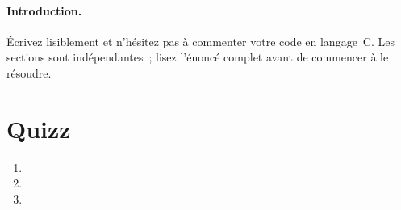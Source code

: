\documentclass[ds]{sujet}
\begin{document}
\formation{} 
\matiere{}  
\auteur{} 
\def\SujetClsNumero{}
\paragraph{Introduction.}
\'Ecrivez lisiblement et n'h\'esitez pas \`a commenter votre code en
langage~C. Les sections sont ind\'ependantes~; lisez l'\'enonc\'e
complet avant de commencer \`a le r\'esoudre.
\section{Quizz}
\begin{enumerate}
\item
\item
\item
\end{enumerate}



\end{document}

